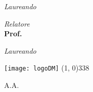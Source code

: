 \begin{titlepage}
\begin{center}
{\begin{large}
    \vspace*{-4.23cm} 

    \begin{flushright}
    \textit{Laureando}\\ 
    \vspace{5pt} 
    \textbf{\myName}
    \end{flushright}
    \end{large}
}{
    \begin{large}
    \begin{flushleft}
    \textit{Relatore}\\ 
    \vspace{5pt} 
    \textbf{Prof. \mySupervisor}
    \end{flushleft}

    \vspace*{-2.36cm} 

    \begin{flushright}
    \textit{Laureando}\\ 
    \vspace{5pt} 
    \textbf{\myName}
    \end{flushright}
    \end{large}
}

\vfill
\texttt{[image: logoDM]}
\line(1, 0){338} \\
\begin{normalsize}
\textsc{A.A. \myAA}
\end{normalsize}

\end{center}
\end{titlepage}
